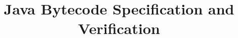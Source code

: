 \documentclass[lettersizepaper,8.5pt]{sig-alternate}
\begin{document}

\title{ Java Bytecode Specification and Verification }



\maketitle



\begin{abstract}

\end{abstract}












\end{document}

